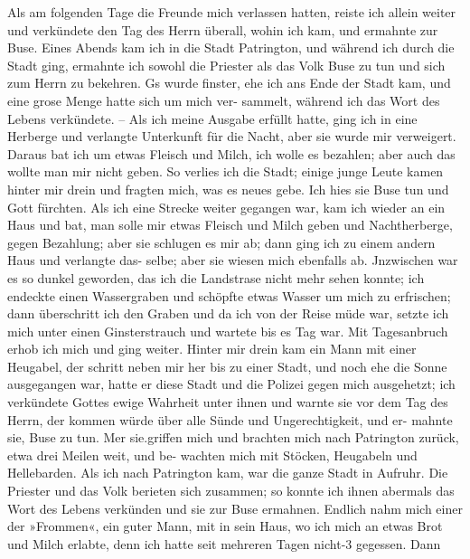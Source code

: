 Als am folgenden Tage die Freunde mich verlassen hatten,
reiste ich allein weiter und verkündete den Tag des Herrn überall,
wohin ich kam, und ermahnte zur Buse. Eines Abends kam ich
in die Stadt Patrington, und während ich durch die Stadt ging,
ermahnte ich sowohl die Priester als das Volk Buse zu tun und
sich zum Herrn zu bekehren. Gs wurde finster, ehe ich ans Ende
der Stadt kam, und eine grose Menge hatte sich um mich ver-
sammelt, während ich das Wort des Lebens verkündete. -- Als
ich meine Ausgabe erfüllt hatte, ging ich in eine Herberge und
verlangte Unterkunft für die Nacht, aber sie wurde mir verweigert.
Daraus bat ich um etwas Fleisch und Milch, ich wolle es bezahlen;
aber auch das wollte man mir nicht geben. So verlies ich die
Stadt; einige junge Leute kamen hinter mir drein und fragten
mich, was es neues gebe. Ich hies sie Buse tun und Gott
fürchten. Als ich eine Strecke weiter gegangen war, kam ich wieder
an ein Haus und bat, man solle mir etwas Fleisch und Milch
geben und Nachtherberge, gegen Bezahlung; aber sie schlugen es
mir ab; dann ging ich zu einem andern Haus und verlangte das-
selbe; aber sie wiesen mich ebenfalls ab. Jnzwischen war es so
dunkel geworden, das ich die Landstrase nicht mehr sehen konnte;
ich endeckte einen Wassergraben und schöpfte etwas Wasser um
mich zu erfrischen; dann überschritt ich den Graben und da ich
von der Reise müde war, setzte ich mich unter einen Ginsterstrauch
und wartete bis es Tag war. Mit Tagesanbruch erhob ich mich
und ging weiter. Hinter mir drein kam ein Mann mit einer
Heugabel, der schritt neben mir her bis zu einer Stadt, und
noch ehe die Sonne ausgegangen war, hatte er diese Stadt und
die Polizei gegen mich ausgehetzt; ich verkündete Gottes ewige
Wahrheit unter ihnen und warnte sie vor dem Tag des Herrn,
der kommen würde über alle Sünde und Ungerechtigkeit, und er-
mahnte sie, Buse zu tun. Mer sie.griffen mich und brachten
mich nach Patrington zurück, etwa drei Meilen weit, und be-
wachten mich mit Stöcken, Heugabeln und Hellebarden. Als ich
nach Patrington kam, war die ganze Stadt in Aufruhr. Die
Priester und das Volk berieten sich zusammen; so konnte ich
ihnen abermals das Wort des Lebens verkünden und sie zur Buse
ermahnen. Endlich nahm mich einer der »Frommen«, ein guter
Mann, mit in sein Haus, wo ich mich an etwas Brot und Milch
erlabte, denn ich hatte seit mehreren Tagen nicht-3 gegessen. Dann


